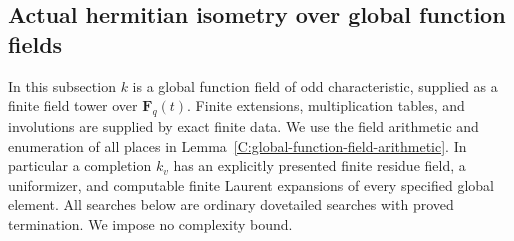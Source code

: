 \subsection{Actual hermitian isometry over global function fields}
\label{C:global-function-hermitian-subsection}

In this subsection $k$ is a global function field of odd
characteristic, supplied as a finite field tower over
$\mathbf F_q(t)$.  Finite extensions, multiplication tables,
and involutions are supplied by exact finite data.
We use the field arithmetic and enumeration of all places in
Lemma~\ref{C:global-function-field-arithmetic}.
In particular a completion $k_v$ has an explicitly presented
finite residue field, a uniformizer, and computable finite
Laurent expansions of every specified global element.
All searches below are ordinary dovetailed searches with
proved termination.  We impose no complexity bound.

